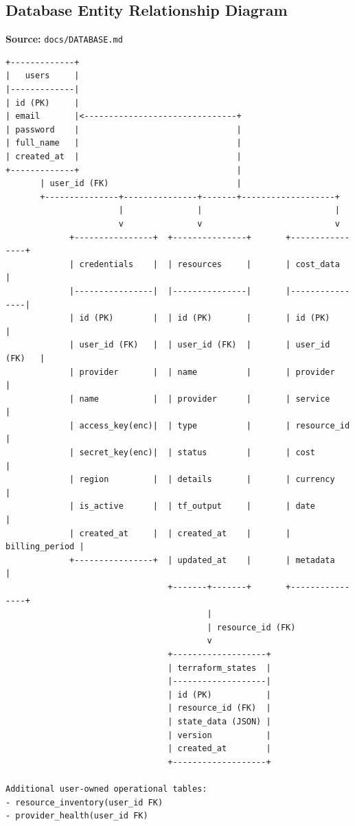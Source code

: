 \subsection{Database Entity Relationship Diagram}
\textbf{Source:} \texttt{docs/DATABASE.md}
\begin{lstlisting}[numbers=none,basicstyle=\ttfamily\tiny,caption={Database ER Diagram Adapted from docs/DATABASE.md}]
+-------------+
|   users     |
|-------------|
| id (PK)     |
| email       |<-------------------------------+
| password    |                                |
| full_name   |                                |
| created_at  |                                |
+-------------+                                |
       | user_id (FK)                          |
       +---------------+---------------+-------+-------------------+
                       |               |                           |
                       v               v                           v
             +----------------+  +---------------+       +----------------+
             | credentials    |  | resources     |       | cost_data      |
             |----------------|  |---------------|       |----------------|
             | id (PK)        |  | id (PK)       |       | id (PK)        |
             | user_id (FK)   |  | user_id (FK)  |       | user_id (FK)   |
             | provider       |  | name          |       | provider       |
             | name           |  | provider      |       | service        |
             | access_key(enc)|  | type          |       | resource_id    |
             | secret_key(enc)|  | status        |       | cost           |
             | region         |  | details       |       | currency       |
             | is_active      |  | tf_output     |       | date           |
             | created_at     |  | created_at    |       | billing_period |
             +----------------+  | updated_at    |       | metadata       |
                                 +-------+-------+       +----------------+
                                         |
                                         | resource_id (FK)
                                         v
                                 +-------------------+
                                 | terraform_states  |
                                 |-------------------|
                                 | id (PK)           |
                                 | resource_id (FK)  |
                                 | state_data (JSON) |
                                 | version           |
                                 | created_at        |
                                 +-------------------+

Additional user-owned operational tables:
- resource_inventory(user_id FK)
- provider_health(user_id FK)
\end{lstlisting}

